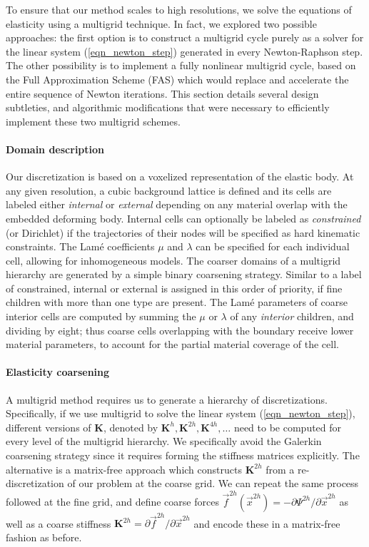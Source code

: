 To ensure that our method scales to high resolutions, we solve the equations of elasticity using a multigrid technique. In fact, we explored two possible approaches: the first option is to construct a multigrid cycle purely as a solver for
the linear system (\ref{eqn_newton_step}) generated in every Newton-Raphson step. The other possibility is to implement a fully nonlinear multigrid cycle, based on the Full
Approximation Scheme (FAS) which would replace and accelerate the entire sequence of Newton iterations. This section details several design subtleties, and algorithmic modifications
that were necessary to efficiently implement these two multigrid schemes. 

\paragraph{Domain description} Our discretization is based on a voxelized representation of the elastic body. At any given resolution, a cubic background lattice is defined and
its cells are labeled either \emph{internal} or \emph{external} depending on any material overlap with the embedded deforming body. Internal cells can optionally be labeled as
\emph{constrained} (or Dirichlet) if the trajectories of their nodes will be specified as hard kinematic constraints. The Lam\'{e} coefficients $\mu$ and $\lambda$ can be specified for
each individual cell, allowing for inhomogeneous models. The coarser domains of a multigrid hierarchy are generated by a simple binary coarsening strategy. Similar to
\cite{Zhu:2010:EMM} a label of constrained, internal or external is assigned in this order of priority, if fine children with more than one type are present. The Lam\'{e} parameters of
coarse interior cells are computed by summing the $\mu$ or $\lambda$ of any \emph{interior} children, and dividing by eight; thus coarse cells overlapping with the boundary receive
lower material parameters, to account for the partial material coverage of the cell.

\paragraph{Elasticity coarsening} A multigrid method requires us to generate a hierarchy of discretizations. Specifically, if we use multigrid to solve the linear system
(\ref{eqn_newton_step}), different versions of $\mathbf{K}$, denoted by $\mathbf{K}^h,\mathbf{K}^{2h},\mathbf{K}^{4h},\ldots$ need to be computed for every level of the multigrid
hierarchy. We specifically avoid the Galerkin coarsening strategy since it requires forming the stiffness matrices explicitly. The alternative is a 
matrix-free approach which constructs $\mathbf{K}^{2h}$ from a re-discretization of our problem at the coarse grid. We can repeat the same process followed at the fine grid, and
define coarse forces $\vec{f}^{2h}(\vec{x}^{2h})=-\partial\Psi^{2h}/\partial\vec{x}^{2h}$ as well as a coarse stiffness $\mathbf{K}^{2h}=\partial\vec{f}^{2h}/\partial\vec{x}^{2h}$ and
encode these in a matrix-free fashion as before. 

